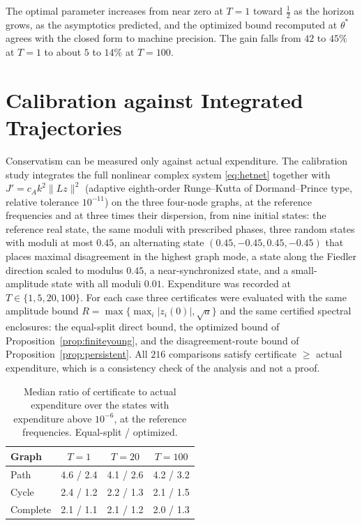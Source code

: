 \documentclass[11pt,notitlepage]{report}
\theoremstyle{definition}
\theoremstyle{remark}
\begin{document}
The optimal parameter increases from near zero at $T=1$ toward $\tfrac12$ as the horizon grows, as the asymptotics predicted, and the optimized bound recomputed at $\theta^*$ agrees with the closed form to machine precision. The gain falls from $42$ to $45\%$ at $T=1$ to about $5$ to $14\%$ at $T=100$.

\section{Calibration against Integrated Trajectories}
Conservatism can be measured only against actual expenditure. The calibration study integrates the full nonlinear complex system \eqref{eq:hetnet} together with $J'=c_Ak^2\|Lz\|^2$ (adaptive eighth-order Runge--Kutta of Dormand--Prince type, relative tolerance $10^{-11}$) on the three four-node graphs, at the reference frequencies and at three times their dispersion, from nine initial states: the reference real state, the same moduli with prescribed phases, three random states with moduli at most $0.45$, an alternating state $(0.45,-0.45,0.45,-0.45)$ that places maximal disagreement in the highest graph mode, a state along the Fiedler direction scaled to modulus $0.45$, a near-synchronized state, and a small-amplitude state with all moduli $0.01$. Expenditure was recorded at $T\in\{1,5,20,100\}$. For each case three certificates were evaluated with the same amplitude bound $R=\max\{\max_i|z_i(0)|,\sqrt a\}$ and the same certified spectral enclosures: the equal-split direct bound, the optimized bound of Proposition~\ref{prop:finiteyoung}, and the disagreement-route bound of Proposition~\ref{prop:persistent}. All $216$ comparisons satisfy certificate $\ge$ actual expenditure, which is a consistency check of the analysis and not a proof.
\begin{table}[ht]\centering\small
\caption{Median ratio of certificate to actual expenditure over the states with expenditure above $10^{-6}$, at the reference frequencies. Equal-split / optimized.}
\begin{tabular}{lccc}\toprule
Graph&$T=1$&$T=20$&$T=100$\\\midrule
Path&4.6 / 2.4&4.1 / 2.6&4.2 / 3.2\\
Cycle&2.4 / 1.2&2.2 / 1.3&2.1 / 1.5\\
Complete&2.1 / 1.1&2.1 / 1.2&2.0 / 1.3\\\bottomrule
\end{tabular}
\end{table}
\end{document}
